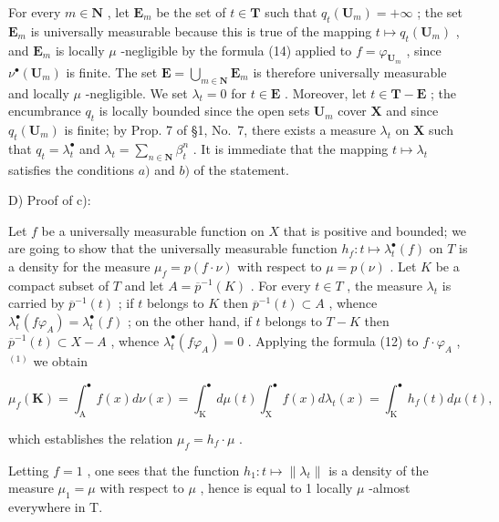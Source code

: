 For every \(m \in \mathbf{N}\) , let \(\mathbf{E}_m\) be the set of \(t \in \mathbf{T}\) such that \(q_t(\mathbf{U}_m) = +\infty\) ; the set \(\mathbf{E}_m\) is universally measurable because this is true of the mapping \(t \mapsto q_t(\mathbf{U}_m)\) , and \(\mathbf{E}_m\) is locally \(\mu\) -negligible by the formula (14) applied to \(f = \varphi_{\mathbf{U}_m}\) , since \(\nu^\bullet(\mathbf{U}_m)\) is finite. The set \(\mathbf{E} = \bigcup_{m \in \mathbf{N}} \mathbf{E}_m\) is therefore universally measurable and locally \(\mu\) -negligible. We set \(\lambda_t = 0\) for \(t \in \mathbf{E}\) . Moreover, let \(t \in \mathbf{T} - \mathbf{E}\) ; the encumbrance \(q_t\) is locally bounded since the open sets \(\mathbf{U}_m\) cover \(\mathbf{X}\) and since \(q_t(\mathbf{U}_m)\) is finite; by Prop. 7 of §1, No.~7, there exists a measure \(\lambda_t\) on \(\mathbf{X}\) such that \(q_t = \lambda_t^\bullet\) and \(\lambda_t = \sum_{n \in \mathbf{N}} \beta_t^n\) . It is immediate that the mapping \(t \mapsto \lambda_t\) satisfies the conditions \(a)\) and \(b)\) of the statement.

D) Proof of c):

Let \(f\) be a universally measurable function on \(X\) that is positive and bounded; we are going to show that the universally measurable function \(h_f: t \mapsto \lambda_t^\bullet(f)\) on \(T\) is a density for the measure \(\mu_f = p(f \cdot \nu)\) with respect to \(\mu = p(\nu)\) . Let \(K\) be a compact subset of \(T\) and let \(A = \overline{p}^{-1}(K)\) . For every \(t \in T\) , the measure \(\lambda_t\) is carried by \(\overline{p}^{-1}(t)\) ; if \(t\) belongs to \(K\) then \(\overline{p}^{-1}(t) \subset A\) , whence \(\lambda_t^\bullet(f\varphi_A) = \lambda_t^\bullet(f)\) ; on the other hand, if \(t\) belongs to \(T - K\) then \(\overline{p}^{-1}(t) \subset X - A\) , whence \(\lambda_t^\bullet(f\varphi_A) = 0\) . Applying the formula (12) to \(f \cdot \varphi_A\) , \(^{(1)}\) we obtain

\[
\mu_ {f} (\mathbf {K}) = \int_ {\mathrm{A}} ^ {\bullet} f (x) d \nu (x) = \int_ {\mathrm{K}} ^ {\bullet} d \mu (t) \int_ {\mathrm{X}} ^ {\bullet} f (x) d \lambda_ {t} (x) = \int_ {\mathrm{K}} ^ {\bullet} h _ {f} (t) d \mu (t),
\]

which establishes the relation \(\mu_f = h_f \cdot \mu\) .

Letting \(f = 1\) , one sees that the function \(h_1: t \mapsto \| \lambda_t \|\) is a density of the measure \(\mu_1 = \mu\) with respect to \(\mu\) , hence is equal to 1 locally \(\mu\) -almost everywhere in T.

